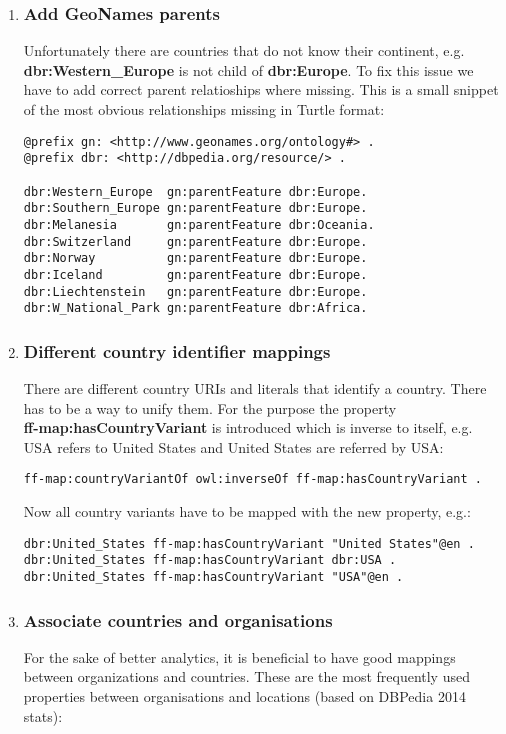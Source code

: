 \begin{enumerate}
    \item \subsubsection{Add GeoNames parents}
    Unfortunately there are countries that do not know their continent, e.g. \\ \textbf{dbr:Western\_Europe} is not child of \textbf{dbr:Europe}. To fix this issue we have to add correct parent relatioships where missing. This is a small snippet of the most obvious relationships missing in Turtle format:
\begin{verbatim}
@prefix gn: <http://www.geonames.org/ontology#> .
@prefix dbr: <http://dbpedia.org/resource/> .

dbr:Western_Europe  gn:parentFeature dbr:Europe.
dbr:Southern_Europe gn:parentFeature dbr:Europe.
dbr:Melanesia       gn:parentFeature dbr:Oceania.
dbr:Switzerland     gn:parentFeature dbr:Europe.
dbr:Norway          gn:parentFeature dbr:Europe.
dbr:Iceland         gn:parentFeature dbr:Europe.
dbr:Liechtenstein   gn:parentFeature dbr:Europe.
dbr:W_National_Park gn:parentFeature dbr:Africa.
\end{verbatim}

    \item \subsubsection{Different country identifier mappings}
    There are different country URIs and literals that identify a country. There has to be a way to unify them. For the purpose the property \\ \textbf{ff-map:hasCountryVariant} is introduced which is inverse to itself, e.g. USA refers to United States and United States are referred by USA: 
    
\begin{verbatim}
ff-map:countryVariantOf owl:inverseOf ff-map:hasCountryVariant .
\end{verbatim}

    Now all country variants have to be mapped with the new property, e.g.:
\begin{verbatim}
dbr:United_States ff-map:hasCountryVariant "United States"@en .
dbr:United_States ff-map:hasCountryVariant dbr:USA .
dbr:United_States ff-map:hasCountryVariant "USA"@en .
\end{verbatim}    

    \item \subsubsection{Associate countries and organisations}
    For the sake of better analytics, it is beneficial to have good mappings between organizations and countries. These are the most frequently used properties between organisations and locations (based on DBPedia 2014 stats):
    

\end{enumerate}
